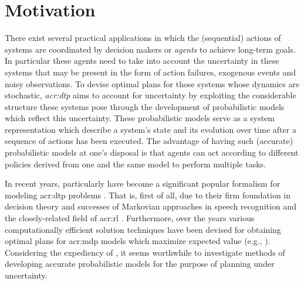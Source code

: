 \section{Motivation}
\label{sec:motivation}

There exist several practical applications in which the (sequential) actions of systems are coordinated by decision makers or \textit{agents} to achieve long-term goals.
In particular these agents need to take into account the uncertainty in these systems that may be present in the form of action failures, exogenous events and noisy observations.
To devise optimal plans for those systems whose dynamics are stochastic, \textit{\acrfull{acr:dtp}} aims to account for uncertainty by exploiting the considerable structure these systems pose through the development of probabilistic models which reflect this uncertainty.
These probabilistic models serve as a system representation which describe a system's state and its evolution over time after a sequence of actions has been executed.
The advantage of having such (accurate) probabilistic models at one's disposal is that agents can act according to different policies derived from one and the same model to perform multiple tasks.

In recent years, particularly \textit{} have become a significant popular formalism for modeling \acrshort{acr:dtp} problems \cite{Boutilier1999}. 
That is, first of all, due to their firm foundation in decision theory and successes of Markovian approaches in speech recognition \cite{baker1992large, gales2008application, rabiner1989tutorial} and the closely-related field of \acrfull{acr:rl} \cite{kaelbling1996reinforcement, Brafman2002}.
Furthermore, over the years various computationally efficient solution techniques have been devised for obtaining optimal plans for \acrshort{acr:mdp} models which maximize expected value (e.g.,  \cite{puterman2014markov, howard1960dynamic}).
Considering the expediency of , it seems worthwhile to investigate methods of developing accurate probabilistic models for the purpose of planning under uncertainty.



